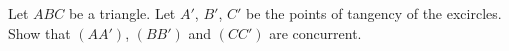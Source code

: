 Let $ABC$ be a triangle. Let $A'$, $B'$, $C'$ be the points of tangency of the excircles. Show that $(AA')$, $(BB')$ and $(CC')$ are concurrent.
